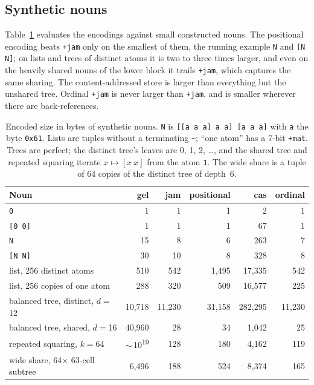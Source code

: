 \documentclass[twoside]{article}
\begin{document}
\subsection{Synthetic nouns}

Table~\ref{tab:eval-toy} evaluates the encodings against small constructed nouns.  The positional encoding beats \texttt{+jam} only on the smallest of them, the running example \lstinline[style=inlinecode]{N} and \lstinline[style=inlinecode]{[N N]}; on lists and trees of distinct atoms it is two to three times larger, and even on the heavily shared nouns of the lower block it trails \texttt{+jam}, which captures the same sharing.  The content-addressed store is larger than everything but the unshared tree.  Ordinal \texttt{+jam} is never larger than \texttt{+jam}, and is smaller wherever there are back-references.

\begin{table}
\centering
\caption{Encoded size in bytes of synthetic nouns.  \lstinline[style=inlinecode]{N} is \texttt{[[a a a] a a] [a a a]} with \texttt{a} the byte \texttt{0x61}.  Lists are tuples without a terminating \texttt{\textasciitilde}; ``one atom'' has a 7-bit \texttt{+mat}.  Trees are perfect; the distinct tree's leaves are 0, 1, 2, \ldots, and the shared tree and repeated squaring iterate $x \mapsto [x~x]$ from the atom \texttt{1}.  The wide share is a tuple of 64 copies of the distinct tree of depth~6.}
\label{tab:eval-toy}
\begin{tabular}{ l r r r r r }
  \hline \hline
  \textbf{Noun} & \textbf{gel} & \textbf{jam} & \textbf{positional} & \textbf{cas} & \textbf{ordinal} \\
  \hline
  \texttt{0}                      & 1      & 1      & 1      & 2       & 1      \\
  \texttt{[0 0]}                  & 1      & 1      & 1      & 67      & 1      \\
  \texttt{N}                      & 15     & 8      & 6      & 263     & 7      \\
  \texttt{[N N]}                  & 30     & 10     & 8      & 328     & 8      \\
  \hline
  list, 256 distinct atoms        & 510    & 542    & 1,495  & 17,335  & 542    \\
  list, 256 copies of one atom    & 288    & 320    & 509    & 16,577  & 225    \\
  balanced tree, distinct, $d={}$12 & 10,718 & 11,230 & 31,158 & 282,295 & 11,230 \\
  \hline
  balanced tree, shared, $d={}$16   & 40,960 & 28     & 34     & 1,042   & 25     \\
  repeated squaring, $k={}$64       & $\sim$\,10\textsuperscript{19} & 128 & 180 & 4,162 & 119    \\
  wide share, 64$\times$ 63-cell subtree & 6,496 & 188 & 524 & 8,374  & 165    \\
  \hline
\end{tabular}%
\end{table}
\end{document}
